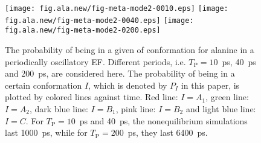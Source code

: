 \documentclass[a4paper,preprint,unsortedaddress,onecolumn]{revtex4-1}
\newcommand{\period}[0]{T_{\textrm{P}}}
\begin{document}
\begin{figure}
  \centering
  \texttt{[image: fig.ala.new/fig-meta-mode2-0010.eps]}
  \texttt{[image: fig.ala.new/fig-meta-mode2-0040.eps]}
  \texttt{[image: fig.ala.new/fig-meta-mode2-0200.eps]}
  \caption{The probability of being in a given of conformation for alanine in a   periodically oscillatory EF. Different periods,
    i.e. $\period =10$~ps, 40~ps and 200~ps, are considered here.  The
    probability of being in a certain conformation $I$, which is
    denoted by $P_I$ in this paper, is plotted by colored lines against
    time. Red line: $I = A_1$,  green line: $I = A_2$,  dark
    blue line: $I = B_1$,  pink line: $I = B_2$ and  light blue
    line: $I = C$. For $\period =10$~ps and 40~ps, the nonequilibrium
    simulations last 1000~ps, while for $\period =200$~ps,
    they last 6400~ps.  }
  \label{fig:tmp9}
\end{figure}
\end{document}
